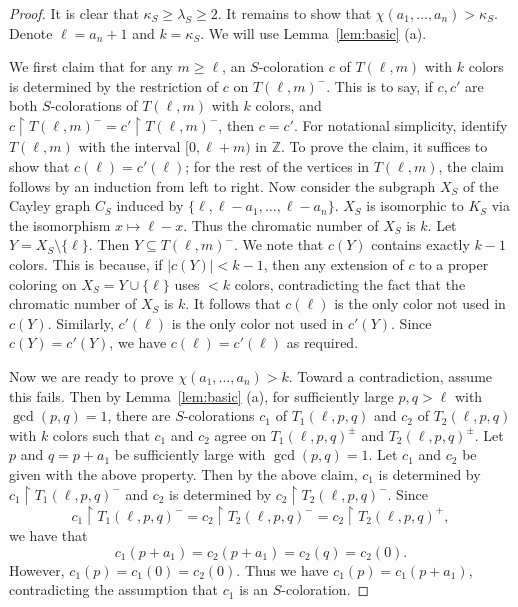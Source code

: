 \documentclass[11pt]{amsart}
\theoremstyle{definition}
\def\Z{\mathbb{Z}}
\def\Z{\mathbb{Z}}
\begin{document}
\begin{proof} It is clear that $\kappa_S\geq \lambda_S\geq 2$. It remains to show that $\chi(a_1,\dots, a_n)>\kappa_S$. Denote $\ell=a_n+1$ and $k=\kappa_S$. We will use Lemma~\ref{lem:basic} (a).

We first claim that for any $m\geq \ell$, an $S$-coloration $c$ of $T(\ell, m)$ with $k$ colors is determined by the restriction of $c$ on $T(\ell, m)^-$. This is to say, if $c, c'$ are both $S$-colorations of $T(\ell, m)$ with $k$ colors, and $c\upharpoonright T(\ell, m)^{-}=c'\upharpoonright T(\ell, m)^-$, then $c=c'$. For notational simplicity, identify $T(\ell, m)$ with the interval $[0, \ell+m)$ in $\Z$. To prove the claim, it suffices to show that $c(\ell)=c'(\ell)$; for the rest of the vertices in $T(\ell, m)$, the claim follows by an induction from left to right. Now consider the subgraph $X_S$ of the Cayley graph $C_S$ induced by $\{\ell, \ell-a_1, \dots, \ell-a_n\}$. $X_S$ is isomorphic to $K_S$ via the isomorphism $x\mapsto \ell-x$. Thus the chromatic number of $X_S$ is $k$. Let $Y=X_S\setminus \{\ell\}$. Then $Y\subseteq T(\ell, m)^-$. We note that $c(Y)$ contains exactly $k-1$ colors. This is because, if $|c(Y)|<k-1$, then any extension of $c$ to a proper coloring on $X_S=Y\cup \{\ell\}$ uses $<k$ colors, contradicting the fact that the chromatic number of $X_S$ is $k$. It follows that $c(\ell)$ is the only color not used in $c(Y)$. Similarly, $c'(\ell)$ is the only color not used in $c'(Y)$. Since $c(Y)=c'(Y)$, we have $c(\ell)=c'(\ell)$ as required. 

Now we are ready to prove $\chi(a_1,\dots, a_n)>k$. Toward a contradiction, assume this fails. Then by Lemma~\ref{lem:basic} (a), for sufficiently large $p, q>\ell$ with $\gcd(p, q)=1$, there are $S$-colorations $c_1$ of $T_1(\ell, p, q)$ and $c_2$ of $T_2(\ell, p, q)$ with $k$ colors such that $c_1$ and $c_2$ agree on $T_1(\ell, p, q)^{\pm}$ and $T_2(\ell, p, q)^{\pm}$. Let $p$ and $q=p+a_1$ be sufficiently large with $\gcd(p, q)=1$. Let $c_1$ and $c_2$ be given with the above property. Then by the above claim, $c_1$ is determined by $c_1\upharpoonright T_1(\ell, p, q)^-$ and $c_2$ is determined by $c_2\upharpoonright T_2(\ell, p, q)^{-}$. Since 
$$c_1\upharpoonright T_1(\ell, p, q)^-=c_2\upharpoonright T_2(\ell, p, q)^{-}=c_2\upharpoonright T_2(\ell, p, q)^+,$$
 we have that 
$$ c_1(p+a_1)=c_2(p+a_1)=c_2(q)=c_2(0). $$
However, $c_1(p)=c_1(0)=c_2(0)$. Thus we have $c_1(p)=c_1(p+a_1)$, contradicting the assumption that $c_1$ is an $S$-coloration.
\end{proof}
\end{document}
